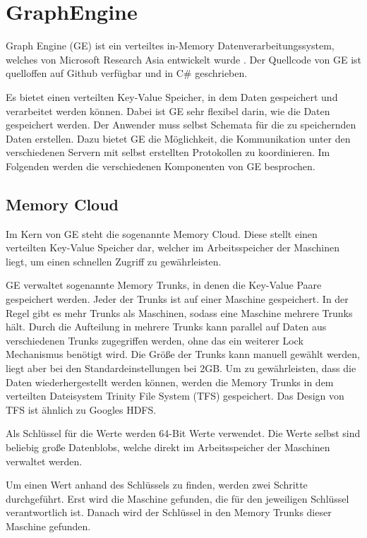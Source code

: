 \section{GraphEngine}

Graph Engine (GE) ist ein verteiltes in-Memory Datenverarbeitungssystem, welches von Microsoft Research Asia 
entwickelt wurde \cite{graphEngine}. Der Quellcode von GE ist quelloffen auf Github verfügbar und in C\# geschrieben.

Es bietet einen verteilten Key-Value Speicher, in dem Daten gespeichert und verarbeitet werden können. Dabei ist GE sehr flexibel darin, wie die Daten gespeichert werden. Der Anwender muss selbst
Schemata für die zu speichernden Daten erstellen. Dazu bietet GE die Möglichkeit, die Kommunikation unter den verschiedenen Servern mit selbst erstellten Protokollen zu koordinieren. Im Folgenden werden die verschiedenen Komponenten von GE besprochen.

\subsection{Memory Cloud}
\label{memoryCloud}

Im Kern von GE steht die sogenannte Memory Cloud. Diese stellt einen verteilten Key-Value Speicher dar, welcher im Arbeitsspeicher der Maschinen
liegt, um einen schnellen Zugriff zu gewährleisten.

GE verwaltet sogenannte Memory Trunks, in denen die Key-Value Paare gespeichert werden. Jeder der Trunks ist auf einer Maschine gespeichert.
In der Regel gibt es mehr Trunks als Maschinen, sodass eine Maschine mehrere Trunks hält. Durch die Aufteilung in mehrere Trunks kann parallel auf Daten aus verschiedenen Trunks zugegriffen
werden, ohne das ein weiterer Lock Mechanismus benötigt wird. Die Größe der Trunks kann manuell gewählt werden, liegt aber bei den Standardeinstellungen bei 2GB.
Um zu gewährleisten, dass die Daten wiederhergestellt werden können, werden die Memory Trunks in dem verteilten Dateisystem Trinity File System (TFS) gespeichert. Das Design von TFS ist ähnlich zu Googles HDFS.

Als Schlüssel für die Werte werden 64-Bit Werte verwendet.
Die Werte selbst sind beliebig große Datenblobs, welche direkt im Arbeitsspeicher der Maschinen verwaltet werden.


Um einen Wert anhand des Schlüssels zu finden, werden zwei Schritte durchgeführt. Erst wird die Maschine gefunden, die für den jeweiligen Schlüssel
verantwortlich ist. Danach wird der Schlüssel in den Memory Trunks dieser Maschine gefunden.

